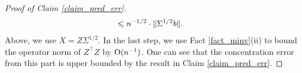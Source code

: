 \begin{proof}[Proof of Claim \ref{claim_pred_err}]
\begin{align*}
		&\leqslant n^{-1/2} \cdot \|\Sigma^{1/2} b\|.
	\end{align*}
	Above, we use $X=Z\Sigma^{1/2}$. In the last step, we use Fact \ref{fact_minv}(ii) to bound the operator norm of $Z^\top Z$ by $\operatorname{O}(n^{-1})$. %
	One can see that the concentration error from this part is upper bounded by the result in Claim \ref{claim_pred_err}.
	
	\iffalse
	Next, we use the fact that the spectral norm of $\cE$ is at most $\sigma \cdot p^{\e}$.
	Hence, the spectral norm of $\Sigma^{1/2} E_i$ is at most
		\[ \sigma \cdot p^{\e} \cdot \norm{\Sigma^{1/2} (X^{\top} X)^{-1} X^{\top}} \cdot \norm{\hat{a}_i}. \]
	Therefore, the cross term is bounded by $\sigma \cdot p^{\e}$ times
	\begin{align*}
			& \bignorm{\Sigma^{1/2} (B^{\star} \hat{a}_i - \beta_i)} \cdot \norm{\Sigma^{1/2} (X^{\top} X)^{-1} X^{\top}} \cdot \norm{\hat{a}_i} \\
		\le & \bignorm{\Sigma^{1/2} (B^{\star} \hat{a}_i - \beta_i)}^2 + \norm{\hat{a}_i}^2 \cdot \bignorm{\Sigma^{1/2} (X^{\top} X)^{-1} X^{\top}}^2 \tag{by Cauchy-Shwartz inequality} \\
		\le & \bignorm{\Sigma^{1/2}(B^{\star} \hat{a}_i - \beta_i)} + \norm{\hat{a}_i}^2 \cdot \bigtr{\Sigma (X^{\top} X)^{-1}}.
	\end{align*}
	\fi


\end{proof}
